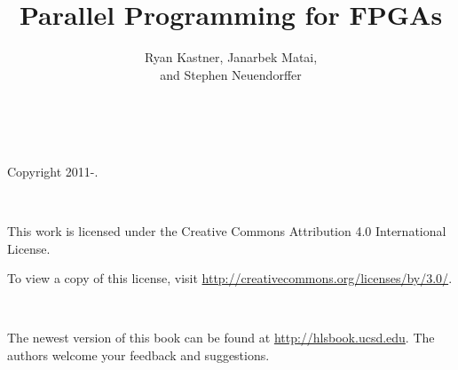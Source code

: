\documentclass[12pt]{book} %
\title{Parallel Programming for FPGAs}
\author{Ryan Kastner, Janarbek Matai,\\ and Stephen Neuendorffer\\\note{Notes are enabled}}
\newcommand{\note}[1]{}
\begin{document}
\setlength{\emergencystretch}{5em}
\setlength{\fboxrule}{1pt}
\setlength{\fboxsep}{9pt}

\setlength{\FrameRule}{\fboxrule}
\setlength{\FrameSep}{\fboxsep}


\newpage\leavevmode\thispagestyle{empty}\newpage

\maketitle
{} \ \\
\begin{center}
\setlength{\parskip}{0.5\baselineskip}
Copyright 2011-\the\year.
\end{center}
\vspace*{20mm} \ \\
\begin{minipage}{\linewidth}
This work is licensed under the Creative Commons Attribution 4.0 International License.

To view a copy of this license, visit \url{http://creativecommons.org/licenses/by/3.0/}. 
\end{minipage}
\vspace*{20mm} \ \\
\begin{minipage}{\linewidth}
The newest version of this book can be found at \url{http://hlsbook.ucsd.edu}.  The authors welcome your feedback and suggestions.
\end{minipage}
 \ \\
\newpage
\tableofcontents
\newpage















%
%


 
\printnoidxglossaries
\end{document}
